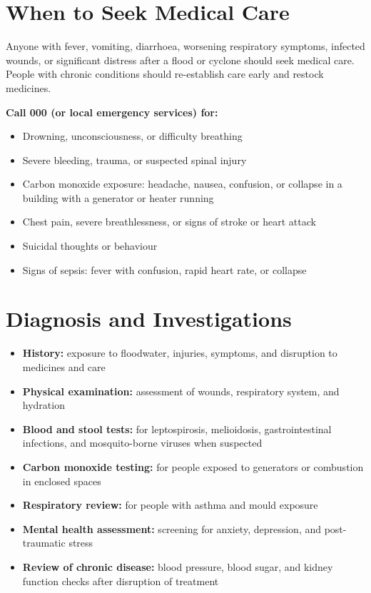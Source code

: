 \section*{When to Seek Medical Care}
Anyone with fever, vomiting, diarrhoea, worsening respiratory symptoms, infected wounds, or significant distress after a flood or cyclone should seek medical care. People with chronic conditions should re-establish care early and restock medicines.

\textbf{Call 000 (or local emergency services) for:}
\begin{itemize}
    \item Drowning, unconsciousness, or difficulty breathing
    \item Severe bleeding, trauma, or suspected spinal injury
    \item Carbon monoxide exposure: headache, nausea, confusion, or collapse in a building with a generator or heater running
    \item Chest pain, severe breathlessness, or signs of stroke or heart attack
    \item Suicidal thoughts or behaviour
    \item Signs of sepsis: fever with confusion, rapid heart rate, or collapse
\end{itemize}

\section*{Diagnosis and Investigations}
\begin{itemize}
    \item \textbf{History:} exposure to floodwater, injuries, symptoms, and disruption to medicines and care
    \item \textbf{Physical examination:} assessment of wounds, respiratory system, and hydration
    \item \textbf{Blood and stool tests:} for leptospirosis, melioidosis, gastrointestinal infections, and mosquito-borne viruses when suspected
    \item \textbf{Carbon monoxide testing:} for people exposed to generators or combustion in enclosed spaces
    \item \textbf{Respiratory review:} for people with asthma and mould exposure
    \item \textbf{Mental health assessment:} screening for anxiety, depression, and post-traumatic stress
    \item \textbf{Review of chronic disease:} blood pressure, blood sugar, and kidney function checks after disruption of treatment
\end{itemize}

